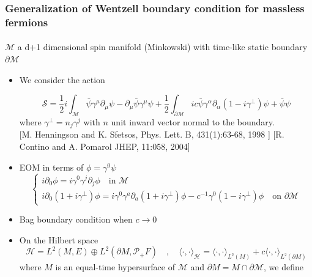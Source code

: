 \documentclass[english]{beamer}
\begin{document}
\begin{frame}[shrink=30]
\frametitle{\small{Generalization of Wentzell boundary condition for massless fermions}}
\framesubtitle{}

$\mathcal{M}$ a d+1 dimensional spin manifold (Minkowski) with time-like static boundary $\partial\mathcal{M}$

\begin{itemize}
\item<2-> We consider the action

\begin{equation*}
\mathcal{S} = \frac{1}{2}i\int_{\mathcal{M}} \bar{\psi} \gamma^\mu \partial_\mu \psi - \partial_\mu \bar{\psi} \gamma^\mu \psi 
+ \frac{1}{2}\int_{\partial \mathcal{M}} ic \bar{\psi} \gamma^\alpha \partial_\alpha (1 - i \gamma^\bot) \psi
+ \bar{\psi} \psi
\end{equation*}
where $\gamma^\bot = n_j\gamma^j$ with $n$ unit inward vector normal to the boundary.\\
\tiny\color{blue}[M. Henningson and K. Sfetsos,
Phys. Lett. B, 431(1):63-68, 1998
] \color{black}\normalsize
\tiny\color{blue} [R. Contino and A. Pomarol JHEP, 11:058, 2004]
\color{black}\normalsize
%
%
\item<3-> EOM in terms of $\phi = \gamma^0 \psi$
\begin{equation*}
\begin{cases}
i \partial_0 \phi = i \gamma^0 \gamma^j \partial_j \phi   \quad \textrm{in $\mathcal{M}$}\\
i \partial_0(1 + i\gamma^\bot) \phi = i\gamma^0 \gamma^a \partial_a (1+ i\gamma^\bot)\phi - c^{-1} \gamma^0(1 - i \gamma^{\bot})\phi \quad \textrm{on $\partial \mathcal{M}$}
\end{cases}
\end{equation*}
%
\item<4-> Bag boundary condition when $c\rightarrow0$ 
%
\item<5-> On the Hilbert space 
\begin{equation*}
\mathcal{H} = L^{2}(M,E)\oplus L^{2}(\partial M, \mathcal{P}_+ F) \quad,\quad
\langle \cdot, \cdot \rangle _\mathcal{H} = \langle \cdot, \cdot \rangle _{L^2(M)} + c \langle \cdot, \cdot \rangle _{L^2(\partial M)}
\end{equation*}
 where $M$ is an equal-time hypersurface of $\mathcal{M}$ and $\partial M = M\cap \partial \mathcal{M}$, we define



\end{itemize}
\end{frame}
\end{document}

